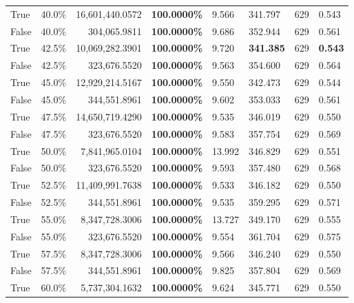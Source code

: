 \begin{table}[H]
\begin{tabular}{|m{}| m{}| r | R{0.13\textwidth}| R{0.09\textwidth}| R{0.09\textwidth}| R{0.09\textwidth}| R{0.11\textwidth}}
True & 40.0\% & 16,601,440.0572 & \bfseries \color{red} 100.0000\% & 9.566 & 341.797 & 629 & 0.543 \\
False & 40.0\% & 304,065.9811 & \bfseries \color{red} 100.0000\% & 9.686 & 352.944 & 629 & 0.561 \\
True & 42.5\% & 10,069,282.3901 & \bfseries \color{red} 100.0000\% & 9.720 & \bfseries \color{red} 341.385 & 629 & \bfseries \color{red} 0.543 \\
False & 42.5\% & 323,676.5520 & \bfseries \color{red} 100.0000\% & 9.563 & 354.600 & 629 & 0.564 \\
True & 45.0\% & 12,929,214.5167 & \bfseries \color{red} 100.0000\% & 9.550 & 342.473 & 629 & 0.544 \\
False & 45.0\% & 344,551.8961 & \bfseries \color{red} 100.0000\% & 9.602 & 353.033 & 629 & 0.561 \\
True & 47.5\% & 14,650,719.4290 & \bfseries \color{red} 100.0000\% & 9.535 & 346.019 & 629 & 0.550 \\
False & 47.5\% & 323,676.5520 & \bfseries \color{red} 100.0000\% & 9.583 & 357.754 & 629 & 0.569 \\
True & 50.0\% & 7,841,965.0104 & \bfseries \color{red} 100.0000\% & 13.992 & 346.829 & 629 & 0.551 \\
False & 50.0\% & 323,676.5520 & \bfseries \color{red} 100.0000\% & 9.593 & 357.480 & 629 & 0.568 \\
True & 52.5\% & 11,409,991.7638 & \bfseries \color{red} 100.0000\% & 9.533 & 346.182 & 629 & 0.550 \\
False & 52.5\% & 344,551.8961 & \bfseries \color{red} 100.0000\% & 9.535 & 359.295 & 629 & 0.571 \\
True & 55.0\% & 8,347,728.3006 & \bfseries \color{red} 100.0000\% & 13.727 & 349.170 & 629 & 0.555 \\
False & 55.0\% & 323,676.5520 & \bfseries \color{red} 100.0000\% & 9.554 & 361.704 & 629 & 0.575 \\
True & 57.5\% & 8,347,728.3006 & \bfseries \color{red} 100.0000\% & 9.566 & 346.240 & 629 & 0.550 \\
False & 57.5\% & 344,551.8961 & \bfseries \color{red} 100.0000\% & 9.825 & 357.804 & 629 & 0.569 \\
True & 60.0\% & 5,737,304.1632 & \bfseries \color{red} 100.0000\% & 9.624 & 345.771 & 629 & 0.550 \\

\end{tabular}
\end{table}
